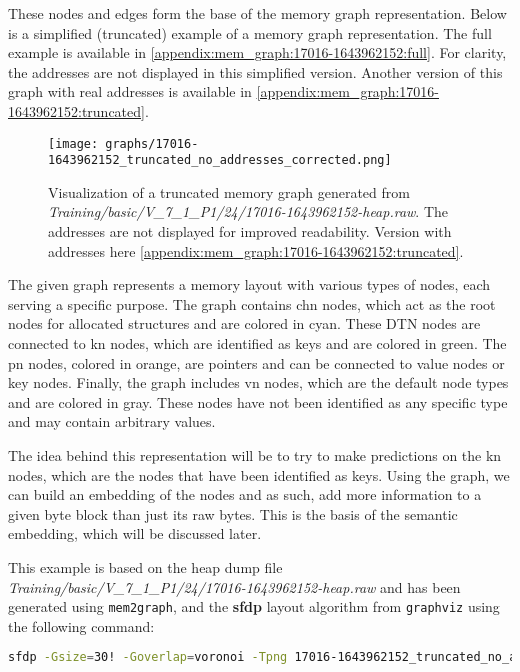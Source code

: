 These nodes and edges form the base of the memory graph representation. Below is a simplified (truncated) example of a memory graph representation. The full example is available in \ref{appendix:mem_graph:17016-1643962152:full}. For clarity, the addresses are not displayed in this simplified version. Another version of this graph with real addresses is available in \ref{appendix:mem_graph:17016-1643962152:truncated}.

\begin{figure}[H]\label{methods:mem_graph:17016-1643962152:simplified}
    \centering
    \texttt{[image: graphs/17016-1643962152\_truncated\_no\_addresses\_corrected.png]}
    \caption{Visualization of a truncated memory graph generated from \textit{Training/basic/V\_7\_1\_P1/24/17016-1643962152-heap.raw}. The addresses are not displayed for improved readability. Version with addresses here \ref{appendix:mem_graph:17016-1643962152:truncated}.}
\end{figure}

The given graph represents a memory layout with various types of nodes, each serving a specific purpose. The graph contains \gls{chn} nodes, which act as the root nodes for allocated structures and are colored in cyan. These DTN nodes are connected to \gls{kn} nodes, which are identified as keys and are colored in green. The \gls{pn} nodes, colored in orange, are pointers and can be connected to value nodes or key nodes. Finally, the graph includes \gls{vn} nodes, which are the default node types and are colored in gray. These nodes have not been identified as any specific type and may contain arbitrary values.

The idea behind this representation will be to try to make predictions on the \gls{kn} nodes, which are the nodes that have been identified as keys. Using the graph, we can build an embedding of the nodes and as such, add more information to a given byte block than just its raw bytes. This is the basis of the semantic embedding, which will be discussed later.

This example is based on the heap dump file \textit{Training/basic/V\_7\_1\_P1/24/17016-1643962152-heap.raw} and has been generated using \texttt{mem2graph}, and the \textbf{sfdp} layout algorithm from \texttt{graphviz} using the following command:

\begin{lstlisting}[language=bash, caption={Command used to generate the memory graph visualization of \textit{Training/basic/V\_7\_1\_P1/24/17016-1643962152-heap.raw}}]
    sfdp -Gsize=30! -Goverlap=voronoi -Tpng 17016-1643962152_truncated_no_addresses.gv > 17016-1643962152_truncated_no_addresses.png
\end{lstlisting}

